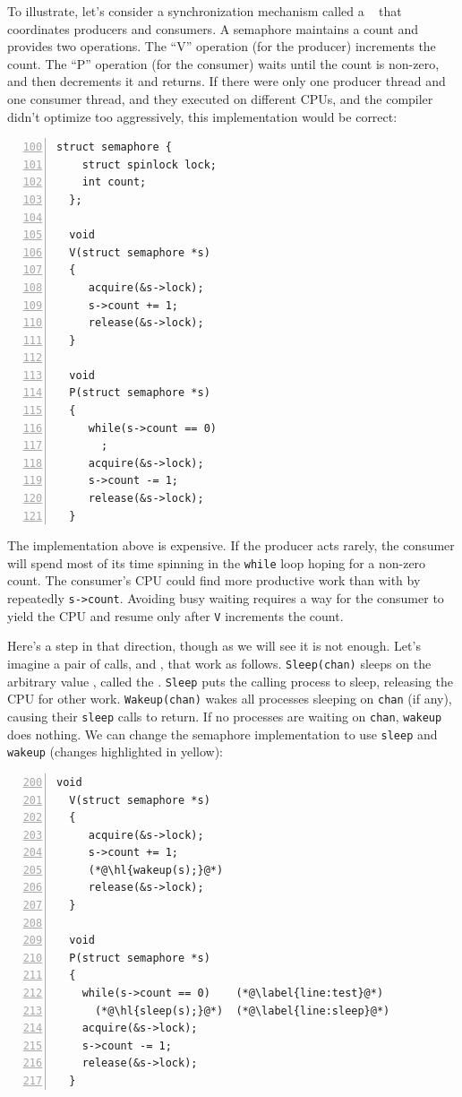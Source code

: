 To illustrate, let's consider a
synchronization mechanism called a ~\cite{dijkstra65} that
coordinates producers and consumers.
A semaphore maintains a count and provides two operations.
The ``V'' operation (for the producer) increments the count.
The ``P'' operation (for the consumer) waits until the count is non-zero,
and then decrements it and returns.
If there were only one producer thread and one consumer thread,
and they executed on different CPUs,
and the compiler didn't optimize too aggressively,
this implementation would be correct:
\begin{lstlisting}[numbers=left,firstnumber=100]
  struct semaphore {
    struct spinlock lock;
    int count;
  };

  void
  V(struct semaphore *s)
  {
     acquire(&s->lock);
     s->count += 1;
     release(&s->lock);
  }

  void
  P(struct semaphore *s)
  {
     while(s->count == 0)
       ;
     acquire(&s->lock);
     s->count -= 1;
     release(&s->lock);
  }
\end{lstlisting}

The implementation above 
is expensive.  If the producer acts
rarely, the consumer will spend most
of its time spinning in the 
\lstinline{while}
loop hoping for a non-zero count.
The consumer's CPU could find more productive work than with
by repeatedly 
\lstinline{s->count}.
Avoiding busy waiting requires
a way for the consumer to yield the CPU
and resume only after
\lstinline{V}
increments the count.

Here's a step in that direction, though as we
will see it is not enough.
Let's imagine a pair of calls, 
and
,
that work as follows.
\lstinline{Sleep(chan)}
sleeps on the arbitrary value
,
called the 
.
\lstinline{Sleep}
puts the calling process to sleep, releasing the CPU
for other work.
\lstinline{Wakeup(chan)}
wakes all processes sleeping on
\lstinline{chan}
(if any), causing their
\lstinline{sleep}
calls to return.
If no processes are waiting on
\lstinline{chan},
\lstinline{wakeup}
does nothing.
We can change the semaphore implementation to use
\lstinline{sleep}
and
\lstinline{wakeup} (changes highlighted in yellow):
\begin{lstlisting}[numbers=left,firstnumber=200]
  void
  V(struct semaphore *s)
  {
     acquire(&s->lock);
     s->count += 1;
     (*@\hl{wakeup(s);}@*)
     release(&s->lock);
  }
  
  void
  P(struct semaphore *s)
  {
    while(s->count == 0)    (*@\label{line:test}@*)
      (*@\hl{sleep(s);}@*)  (*@\label{line:sleep}@*)
    acquire(&s->lock);
    s->count -= 1;
    release(&s->lock);
  }
\end{lstlisting}

